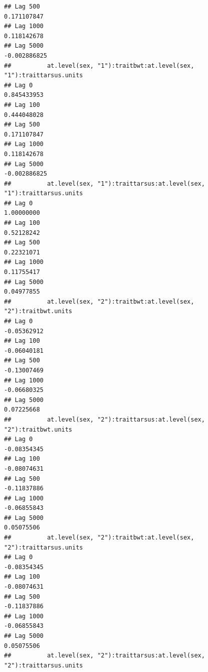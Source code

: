 \documentclass[
  12pt,
]{book}
\begin{document}
\begin{verbatim}
## Lag 500                                                       0.171107847
## Lag 1000                                                      0.118142678
## Lag 5000                                                     -0.002886825
##          at.level(sex, "1"):traitbwt:at.level(sex, "1"):traittarsus.units
## Lag 0                                                         0.845433953
## Lag 100                                                       0.444048028
## Lag 500                                                       0.171107847
## Lag 1000                                                      0.118142678
## Lag 5000                                                     -0.002886825
##          at.level(sex, "1"):traittarsus:at.level(sex, "1"):traittarsus.units
## Lag 0                                                             1.00000000
## Lag 100                                                           0.52128242
## Lag 500                                                           0.22321071
## Lag 1000                                                          0.11755417
## Lag 5000                                                          0.04977855
##          at.level(sex, "2"):traitbwt:at.level(sex, "2"):traitbwt.units
## Lag 0                                                      -0.05362912
## Lag 100                                                    -0.06040181
## Lag 500                                                    -0.13007469
## Lag 1000                                                   -0.06680325
## Lag 5000                                                    0.07225668
##          at.level(sex, "2"):traittarsus:at.level(sex, "2"):traitbwt.units
## Lag 0                                                         -0.08354345
## Lag 100                                                       -0.08074631
## Lag 500                                                       -0.11837886
## Lag 1000                                                      -0.06855843
## Lag 5000                                                       0.05075506
##          at.level(sex, "2"):traitbwt:at.level(sex, "2"):traittarsus.units
## Lag 0                                                         -0.08354345
## Lag 100                                                       -0.08074631
## Lag 500                                                       -0.11837886
## Lag 1000                                                      -0.06855843
## Lag 5000                                                       0.05075506
##          at.level(sex, "2"):traittarsus:at.level(sex, "2"):traittarsus.units

\end{verbatim}
\end{document}
